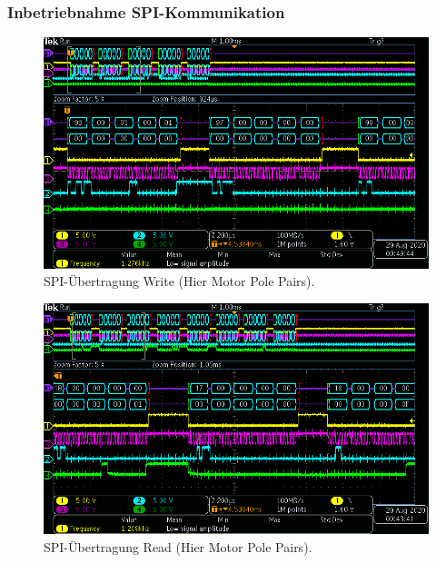 \subsubsection{Inbetriebnahme SPI-Kommunikation}\label{Appendix:TMC4671_SPI}

\begin{figure}[H]
\center
\includegraphics[width = \textwidth]{graphics/TMC4671_Beschreiben_1}
\caption{SPI-Übertragung Write (Hier Motor Pole Pairs).}
\label{fig:TMC4671_Lesen_1}
\end{figure}

\begin{figure}[H]
\center
\includegraphics[width = \textwidth]{graphics/TMC4671_Lesen_1}
\caption{SPI-Übertragung Read (Hier Motor Pole Pairs).}
\label{fig:TMC4671_Lesen_1}
\end{figure}

